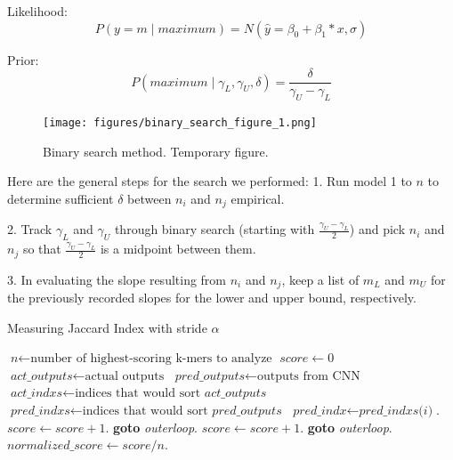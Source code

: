 \documentclass[conference]{IEEEtran}
\begin{document}
Likelihood:
\begin{equation}\label{likelihoodequ}
    P(y=m \mid maximum) = N(\hat{y} = \beta_{0} + \beta_{1} * x, \sigma) 
\end{equation}

Prior:
\begin{equation}\label{priorequ}
    P(maximum \mid \gamma_{L}, \gamma_{U}, \delta) = \frac{\delta}{\gamma_{U} - \gamma_{L}}
\end{equation}

\begin{figure}[H]
    \centering
    \texttt{[image: figures/binary\_search\_figure\_1.png]}
    \setlength{\belowcaptionskip}{-15pt}
    \caption{Binary search method. Temporary figure.}
    \label{dnadigest}
\end{figure}

Here are the general steps for the search we performed:
1. Run model 1 to $n$ to determine sufficient $\delta$ between $n_i$ and $n_j$ empirical. 

2. Track $\gamma_L$ and $\gamma_U$ through binary search (starting with $\frac{\gamma_{U} - \gamma_{L}}{2}$) and pick $n_i$ and $n_j$ so that $\frac{\gamma_{U} - \gamma_{L}}{2}$ is a midpoint between them.

3. In evaluating the slope resulting from $n_i$ and $n_j$, keep a list of $m_L$ and $m_U$ for the previously recorded slopes for the lower and upper bound, respectively.

\begin{algorithm}[H]
\caption{Measuring Jaccard Index with stride $\alpha$}\label{cnnscorestride}
\begin{algorithmic}[1]
\STATE $\textit{n} \gets \text{number of highest-scoring k-mers to analyze}$
\STATE $\textit{score} \gets 0$
\STATE $\textit{act\_outputs} \gets \text{actual outputs}$
\STATE $\textit{pred\_outputs} \gets \text{outputs from CNN}$
\STATE $\textit{act\_indxs} \gets \text{indices that would sort }\textit{act\_outputs}$
\STATE $\textit{pred\_indxs} \gets \text{indices that would sort } \textit{pred\_outputs}$ 
\STATE $\textit{pred\_indx} \gets \textit{pred\_indxs(i)}$.
\STATE $score \gets score+1$.
\STATE \textbf{goto} \emph{outerloop}.
\ENDIF
{}
\STATE $score \gets score+1$.
\STATE \textbf{goto} \emph{outerloop}.
\ENDIF
\ENDFOR
\ENDFOR
\STATE $normalized\_score \gets score / n$.
\EndProcedure
\end{algorithmic}
\end{algorithm}
\end{document}

